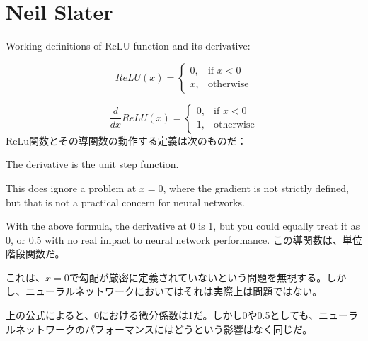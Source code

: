 \documentclass[uplatex,dvipdfmx]{jsarticle} \usepackage{amsmath,amssymb,bm}
\begin{document}
\section*{Neil Slater}
\begin{paracol}{2}
Working definitions of ReLU function and its derivative:

$$ReLU(x) = \begin{cases}
0,& \text{if } x<0\\
x,& \text{otherwise}
\end{cases}$$

$$\frac{d}{dx}ReLU(x) = \begin{cases}
0,& \text{if } x<0\\
1,& \text{otherwise}
\end{cases}$$
\switchcolumn
ReLu関数とその導関数の動作する定義は次のものだ：
\end{paracol}
\vspace{\baselineskip}
\begin{paracol}{2}
The derivative is the unit step function.

This does ignore a problem at $x=0$, where the gradient is not strictly defined, but that is not a practical concern for neural networks.

With the above formula, the derivative at 0 is 1, but you could equally treat it as 0, or 0.5 with no real impact to neural network performance.
\switchcolumn
この導関数は、単位階段関数だ。

これは、$x=0$で勾配が厳密に定義されていないという問題を無視する。しかし、ニューラルネットワークにおいてはそれは実際上は問題ではない。

上の公式によると、0における微分係数は1だ。しかし0や0.5としても、ニューラルネットワークのパフォーマンスにはどうという影響はなく同じだ。
\end{paracol}
\end{document}
